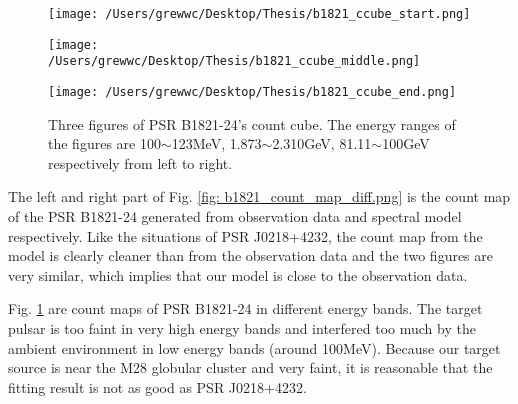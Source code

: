 \documentclass[12pt]{report}
\newcommand{\mycaption}[1]{\protect \caption{#1}}
\begin{document}
              \begin{figure}[!ht]
                \begin{center}
                \begin{minipage}{0.31\textwidth}
                  \begin{center} 
                    \texttt{[image: /Users/grewwc/Desktop/Thesis/b1821\_ccube\_start.png]}
                  \end{center}
                \end{minipage}
                \begin{minipage}{0.31\textwidth}
                  \begin{center}
                    \texttt{[image: /Users/grewwc/Desktop/Thesis/b1821\_ccube\_middle.png]}
                  \end{center}
                \end{minipage}
                \begin{minipage}{0.31\textwidth}
                  \begin{center}
                  \texttt{[image: /Users/grewwc/Desktop/Thesis/b1821\_ccube\_end.png]}
                  \end{center}
                \end{minipage}
              \end{center}
              \mycaption{Three figures of PSR B1821-24's count cube. The energy ranges of the figures are  
                100$\sim$123MeV, 1.873$\sim$2.310GeV, 81.11$\sim$100GeV respectively from left to right.}
              \label{fig: b1821_ccube_1_15_33.png}
              \end{figure}

              The left and right part of Fig. \ref{fig: b1821_count_map_diff.png} is the count 
              map of the PSR B1821-24 generated from observation data and spectral model respectively. 
              Like the situations of PSR J0218+4232, the count map from the model is clearly cleaner than 
              from the observation data and the two figures are very similar, which implies that our model 
              is close to the observation data. 

              Fig. \ref{fig: b1821_ccube_1_15_33.png} are count maps of PSR B1821-24 in different energy 
              bands. The target pulsar is too faint in very high energy bands and interfered too much by the ambient 
              environment in low energy bands (around 100MeV). Because our target source is near the M28 globular 
              cluster and very faint, it is reasonable that the fitting result is not as good as PSR J0218+4232. 
\end{document}
